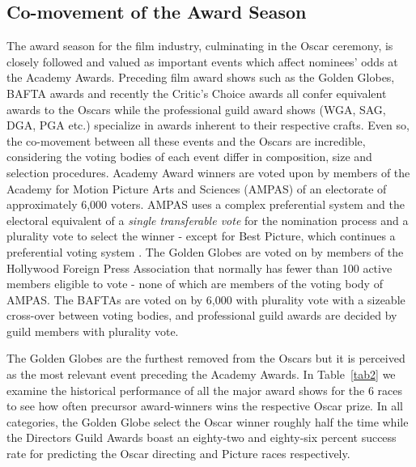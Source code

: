 \documentclass[jou,apacite]{apa6}
\begin{document}
\subsection{Co-movement of the Award Season}
The award season for the film industry, culminating in the Oscar ceremony, is closely followed and valued as important events which affect nominees' odds at the Academy Awards. Preceding film award shows such as the Golden Globes, BAFTA awards and recently the Critic's Choice awards all confer equivalent awards to the Oscars while the professional guild award shows (WGA, SAG, DGA, PGA etc.) specialize in awards inherent to their respective crafts. Even so, the co-movement between all these events and the Oscars are incredible, considering the voting bodies of each event differ in composition, size and selection procedures.  Academy Award winners are voted upon by members of the Academy for Motion Picture Arts and Sciences (AMPAS) of an  electorate of approximately 6,000 voters. AMPAS uses a complex preferential system and the electoral equivalent of a \emph{single transferable vote} for the nomination process and a plurality vote to select the winner - except for Best Picture, which continues a preferential voting system \cite{decision04}. The Golden Globes are voted on by members of the Hollywood Foreign Press Association that normally has fewer than 100 active members eligible to vote - none of which are members of the voting body of AMPAS. The BAFTAs are voted on by 6,000 with plurality vote with a sizeable cross-over between voting bodies, and professional guild awards are decided by guild members with plurality vote.

The Golden Globes are the furthest removed from the Oscars but it is perceived as the most relevant event preceding the Academy Awards. In Table~\ref{tab2} we examine the historical performance of all the major award shows for the 6 races to see how often precursor award-winners wins the respective Oscar prize. In all categories, the Golden Globe select the Oscar winner roughly half the time while the Directors Guild Awards boast an eighty-two and eighty-six percent success rate for predicting the Oscar directing and Picture races respectively.
\end{document}
